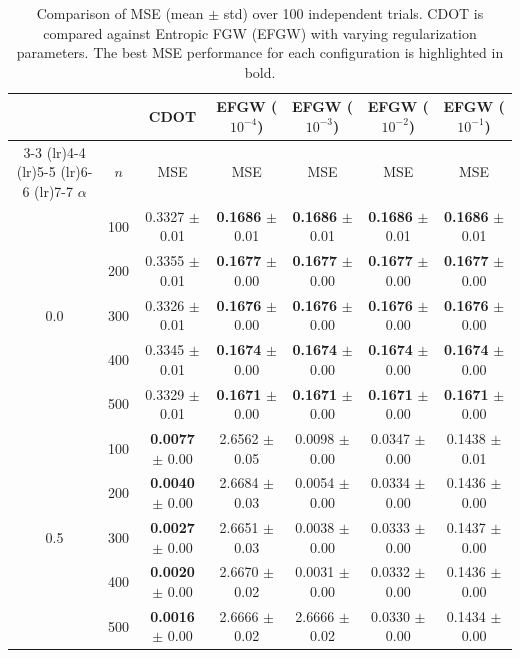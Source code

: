 \documentclass{article}
\theoremstyle{plain}
\theoremstyle{definition}
\theoremstyle{remark}
\begin{document}
\begin{table}[t]
	\centering
	\setlength{\tabcolsep}{11.5pt}
	\caption{Comparison of MSE (mean $\pm$ std) over 100 independent trials. CDOT is compared against Entropic FGW (EFGW) with varying regularization parameters. The best MSE performance for each configuration is highlighted in bold.}
	\label{tab:full-mse}
	\renewcommand{\arraystretch}{1.1}
	\begin{tabular}{ccccccc}
		\toprule
		& & \textbf{CDOT} & \textbf{EFGW ($10^{-4}$)} & \textbf{EFGW ($10^{-3}$)} & \textbf{EFGW ($10^{-2}$)} & \textbf{EFGW ($10^{-1}$)} \\
		\cmidrule(lr){3-3} \cmidrule(lr){4-4} \cmidrule(lr){5-5} \cmidrule(lr){6-6} \cmidrule(lr){7-7}
		$\alpha$ & $n$ & MSE & MSE & MSE & MSE & MSE \\
		\midrule
		\multirow{5}{*}{0.0}
		& 100 & 0.3327 $\pm$ 0.01 & \textbf{0.1686} $\pm$ 0.01 & \textbf{0.1686} $\pm$ 0.01 & \textbf{0.1686} $\pm$ 0.01 & \textbf{0.1686} $\pm$ 0.01 \\
		& 200 & 0.3355 $\pm$ 0.01 & \textbf{0.1677} $\pm$ 0.00 & \textbf{0.1677} $\pm$ 0.00 & \textbf{0.1677} $\pm$ 0.00 & \textbf{0.1677} $\pm$ 0.00 \\
		& 300 & 0.3326 $\pm$ 0.01 & \textbf{0.1676} $\pm$ 0.00 & \textbf{0.1676} $\pm$ 0.00 & \textbf{0.1676} $\pm$ 0.00 & \textbf{0.1676} $\pm$ 0.00 \\
		& 400 & 0.3345 $\pm$ 0.01 & \textbf{0.1674} $\pm$ 0.00 & \textbf{0.1674} $\pm$ 0.00 & \textbf{0.1674} $\pm$ 0.00 & \textbf{0.1674} $\pm$ 0.00 \\
		& 500 & 0.3329 $\pm$ 0.01 & \textbf{0.1671} $\pm$ 0.00 & \textbf{0.1671} $\pm$ 0.00 & \textbf{0.1671} $\pm$ 0.00 & \textbf{0.1671} $\pm$ 0.00 \\
		\midrule
		\multirow{5}{*}{0.5}
		& 100 & \textbf{0.0077} $\pm$ 0.00 & 2.6562 $\pm$ 0.05 & 0.0098 $\pm$ 0.00 & 0.0347 $\pm$ 0.00 & 0.1438 $\pm$ 0.01 \\
		& 200 & \textbf{0.0040} $\pm$ 0.00 & 2.6684 $\pm$ 0.03 & 0.0054 $\pm$ 0.00 & 0.0334 $\pm$ 0.00 & 0.1436 $\pm$ 0.00 \\
		& 300 & \textbf{0.0027} $\pm$ 0.00 & 2.6651 $\pm$ 0.03 & 0.0038 $\pm$ 0.00 & 0.0333 $\pm$ 0.00 & 0.1437 $\pm$ 0.00 \\
		& 400 & \textbf{0.0020} $\pm$ 0.00 & 2.6670 $\pm$ 0.02 & 0.0031 $\pm$ 0.00 & 0.0332 $\pm$ 0.00 & 0.1436 $\pm$ 0.00 \\
		& 500 & \textbf{0.0016} $\pm$ 0.00 & 2.6666 $\pm$ 0.02 & 2.6666 $\pm$ 0.02 & 0.0330 $\pm$ 0.00 & 0.1434 $\pm$ 0.00 \\

\end{tabular}
\end{table}
\end{document}
